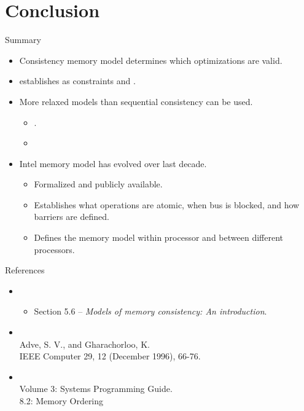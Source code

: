 \section{Conclusion}

\begin{frame}[t]{Summary}
\begin{itemize}
  \item Consistency memory model determines which optimizations are valid.
  \item {} establishes as constraints
         and .
  \item More relaxed models than sequential consistency can be used.
    \begin{itemize}
      \item {}.
      \item {}
    \end{itemize}
  \item Intel memory model has evolved over last decade.
    \begin{itemize}
      \item Formalized and publicly available.
      \item Establishes what operations are atomic, when bus is blocked, and how barriers are defined.
      \item Defines the memory model within processor and between different processors.
    \end{itemize}
\end{itemize}
\end{frame}


\begin{frame}[t]{References}
\begin{itemize}
  \item \bibhennessy
    \begin{itemize}
      \item Section 5.6 -- \emph{Models of memory consistency: An introduction}.
    \end{itemize}

  \item {}\\
        Adve, S. V., and Gharachorloo, K.\\
        IEEE Computer 29, 12 (December 1996), 66-76.

  \item {}\\
        Volume 3: Systems Programming Guide.\\
        8.2: Memory Ordering

\end{itemize}
\end{frame}
